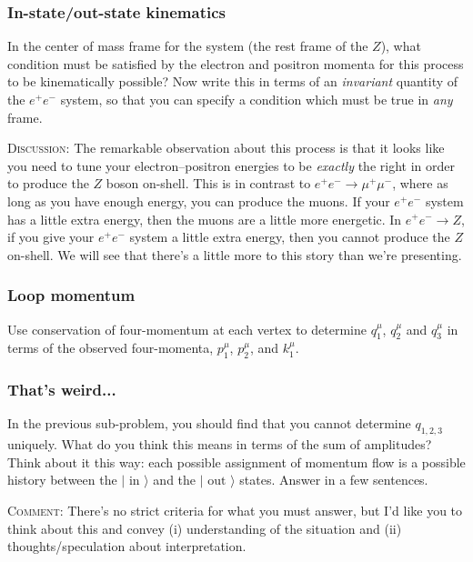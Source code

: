 \documentclass[12pt]{article}
\begin{document}
\subsubsection{In-state/out-state kinematics}

In the center of mass frame for the system (the rest frame of the $Z$), what condition must be satisfied by the electron and positron momenta for this process to be kinematically possible? Now write this in terms of an \emph{invariant} quantity of the $e^+e^-$ system, so that you can specify a condition which must be true in \emph{any} frame.

\textsc{Discussion}: The remarkable observation about this process is that it looks like you need to tune your electron--positron energies to be \emph{exactly} the right in order to produce the $Z$ boson on-shell. This is in contrast to $e^+e^- \to \mu^+ \mu^-$, where as long as you have enough energy, you can produce the muons. If your $e^+e^-$ system has a little extra energy, then the muons are a little more energetic. In $e^+e^- \to Z$, if you give your $e^+e^-$ system a little extra energy, then you cannot produce the $Z$ on-shell. We will see that there's a little more to this story than we're presenting.

\subsubsection{Loop momentum}

Use conservation of four-momentum at each vertex to determine $q_1^\mu$, $q_2^\mu$ and $q_3^\mu$ in terms of the observed four-momenta, $p_1^\mu$, $p_2^\mu$, and $k_1^\mu$. 

\subsubsection{That's weird...}

In the previous sub-problem, you should find that you cannot determine $q_{1,2,3}$ uniquely. What do you think this means in terms of the sum of amplitudes? Think about it this way: each possible assignment of momentum flow is a possible history between the $|\text{ in }\rangle$ and the $|\text{ out }\rangle$ states. Answer in a few sentences. 

\textsc{Comment}: There's no strict criteria for what you must answer, but I'd like you to think about this and convey (i) understanding of the situation and (ii) thoughts/speculation about interpretation.
\end{document}
